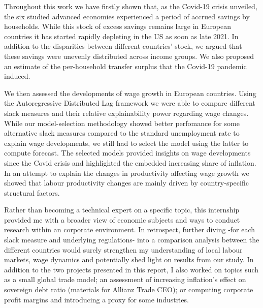 \quad Throughout this work we have firstly shown that, as the Covid-19 crisis unveiled, the six studied advanced economies experienced a period of accrued savings by households. 
While this stock of excess savings remains large in European countries it has started rapidly depleting in the US as soon as late 2021. 
In addition to the disparities between different countries' stock, we argued that these savings were unevenly distributed across income groups.
We also proposed an estimate of the per-household transfer surplus that the Covid-19 pandemic induced.

We then assessed the developments of wage growth in European countries. 
Using the Autoregressive Distributed Lag framework we were able to compare different slack measures and their relative explainability power regarding wage changes.
While our model-selection methodology showed better perfomance for some alternative slack measures compared to the standard unemployment rate to explain wage developments, we still had to select the model using the latter to compute forecast. 
The selected models provided insights on wage developments since the Covid crisis and highlighted the embedded increasing share of inflation. In an attempt to explain the changes in productivity affecting wage growth we showed that labour productivity changes are mainly driven by country-specific structural factors.

Rather than becoming a technical expert on a specific topic, this internship provided me with a broader view of economic subjects and ways to conduct research within an corporate environment. 
In retrospect, further diving -for each slack measure and underlying regulations- into a comparison analysis between the different countries would surely strengthen my understanding of local labour markets, wage dynamics and potentially shed light on results from our study.
In addition to the two projects presented in this report, I also worked on topics such as a small global trade model\cite{az_trade}; an assessment of increasing inflation’s effect on sovereign debt ratio (materials for Allianz Trade CEO\cite{az_debt}); or computing corporate profit margins and introducing a proxy for some industries\cite{az_margins}.
